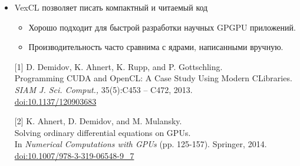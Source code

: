 \documentclass[@BEAMER_OPTIONS@]{beamer}
\newcommand{\CXX}{{\rm C}\plusplus}
\begin{document}
\begin{frame}[fragile]{}
    \begin{itemize}
        \item VexCL позволяет писать компактный и читаемый код
            \begin{itemize}
                \item Хорошо подходит для быстрой разработки научных GPGPU
                    приложений.
                \item Производительность часто сравнима с ядрами, написанными
                    вручную.
            \end{itemize}
            \vspace{\baselineskip}
            \item[{[1]}] D. Demidov, K. Ahnert, K. Rupp, and P. Gottschling.\\
                Programming CUDA and OpenCL: A Case Study Using Modern \CXX Libraries.\\
                \emph{SIAM J. Sci. Comput.,} 35(5):C453 – C472, 2013.\\
                \href{http://dx.doi.org/10.1137/120903683}{doi:10.1137/120903683}
            \item[{[2]}] K. Ahnert, D. Demidov, and M. Mulansky.\\
                Solving ordinary differential equations on GPUs.\\
                In \emph{Numerical Computations with GPUs} (pp. 125-157).  Springer, 2014.
                \href{http://dx.doi.org/10.1007/978-3-319-06548-9\_7}{doi:10.1007/978-3-319-06548-9\_7}
    \end{itemize}
\end{frame}
\end{document}
